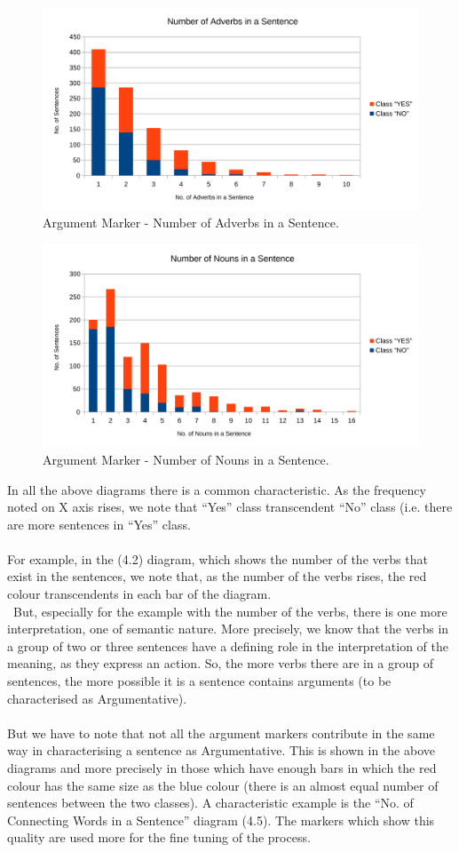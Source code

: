 \begin{figure}[H]
\centering
\includegraphics[width=0.8\linewidth]{figure/arguments/A_adverbs1.pdf}
\caption{Argument Marker - Number of Adverbs in a Sentence.}
\end{figure}

\begin{figure}[H]
\centering
\includegraphics[width=0.8\linewidth]{figure/arguments/A_nouns1.pdf}
\caption{Argument Marker - Number of Nouns in a Sentence.}
\end{figure}

In all the above diagrams there is a common characteristic. As the frequency noted on X axis rises, we note that  ``Yes'' class transcendent ``No'' class (i.e. there are more sentences in ``Yes'' class.\\
\\
For example, in the (4.2) diagram, which shows the number of the verbs that exist in the sentences, we note that, as the number of the verbs rises, the red colour transcendents in each bar of the diagram.\\
\
But, especially for the example with the number of the verbs, there is one more interpretation, one of semantic nature. More precisely, we know that the verbs in a group of  two or three sentences have a defining role in the interpretation of the meaning, as they express an action. So, the more verbs there are in a group of sentences, the more possible it is a sentence contains arguments (to be characterised as Argumentative).\\
\\
But we have to note that not all the argument markers contribute in the same way in characterising a sentence as Argumentative. This is shown in the above diagrams and more precisely in those which have enough bars in which the red colour has the same size as the blue colour (there is an almost equal number of sentences between the two classes). A characteristic example is the ``No. of Connecting Words in a Sentence'' diagram (4.5). The markers which show this quality are used more for the fine tuning of the process.

